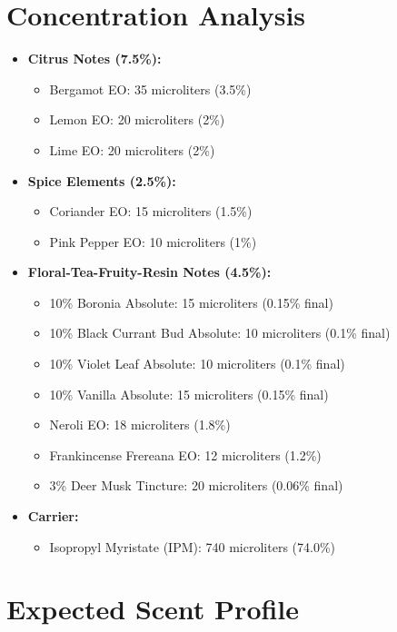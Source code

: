 \documentclass{article}
\begin{document}
\section*{Concentration Analysis}
\begin{itemize}[leftmargin=*]
  \item \textcolor{colaRed}{\textbf{Citrus Notes (7.5\%):}}
  \begin{itemize}
    \item Bergamot EO: 35 microliters (3.5\%)
    \item Lemon EO: 20 microliters (2\%)
    \item Lime EO: 20 microliters (2\%)
  \end{itemize}
  
  \item \textcolor{colaRed}{\textbf{Spice Elements (2.5\%):}}
  \begin{itemize}
    \item Coriander EO: 15 microliters (1.5\%)
    \item Pink Pepper EO: 10 microliters (1\%)
  \end{itemize}
  
  \item \textcolor{violetPurple}{\textbf{Floral-Tea-Fruity-Resin Notes (4.5\%):}}
  \begin{itemize}
    \item 10\% Boronia Absolute: 15 microliters (0.15\% final)
    \item 10\% Black Currant Bud Absolute: 10 microliters (0.1\% final)
    \item 10\% Violet Leaf Absolute: 10 microliters (0.1\% final)
    \item 10\% Vanilla Absolute: 15 microliters (0.15\% final)
    \item Neroli EO: 18 microliters (1.8\%)
    \item Frankincense Frereana EO: 12 microliters (1.2\%)
    \item 3\% Deer Musk Tincture: 20 microliters (0.06\% final)
  \end{itemize}
  
  \item \textcolor{colaBrown}{\textbf{Carrier:}}
  \begin{itemize}
    \item Isopropyl Myristate (IPM): 740 microliters (74.0\%)
  \end{itemize}
\end{itemize}

\section*{Expected Scent Profile}
\end{document}
